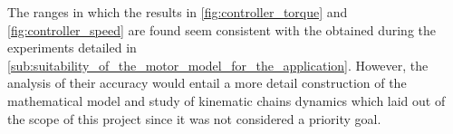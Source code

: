 The ranges in which the results in \ref{fig:controller_torque} and \ref{fig:controller_speed} are found seem consistent with the obtained during the experiments detailed in \ref{sub:suitability_of_the_motor_model_for_the_application}.
However, the analysis of their accuracy would entail a more detail construction of the mathematical model and study of kinematic chains dynamics which laid out of the scope of this project since it was not considered a priority goal.

